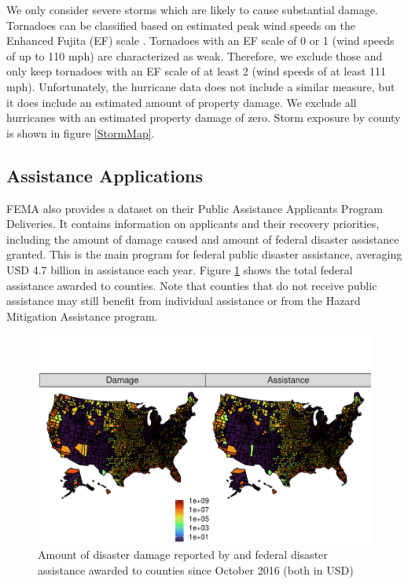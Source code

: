 We only consider severe storms which are likely to cause substantial damage. Tornadoes can be classified based on estimated peak wind speeds on the Enhanced Fujita (EF) scale \citep[for more details see][]{EF_Scale}. Tornadoes with an EF scale of 0 or 1 (wind speeds of up to 110 mph) are characterized as weak. Therefore, we exclude those and only keep tornadoes with an EF scale of at least 2 (wind speeds of at least 111 mph). Unfortunately, the hurricane data does not include a similar measure, but it does include an estimated amount of property damage. We exclude all hurricanes with an estimated property damage of zero.  Storm exposure by county is shown in figure \ref{StormMap}.

\subsection{Assistance Applications}

FEMA also provides a dataset on  their Public Assistance Applicants Program Deliveries. It contains information on applicants and their recovery priorities, including the amount of damage caused and amount of federal disaster assistance granted. This is the main program for federal public disaster assistance, averaging USD 4.7 billion in assistance each year. Figure \ref{AssistanceMap} shows the total federal assistance awarded to counties. Note that counties that do not receive public assistance may still benefit from individual assistance or from the Hazard Mitigation Assistance program.

\begin{figure}[!h]
	\centering
	\includegraphics[scale=1]{"../Code & Data/AssistanceMap.pdf"}
	\caption{Amount of disaster damage reported by and federal disaster assistance awarded to counties since October 2016 (both in USD)}
	\label{AssistanceMap}
\end{figure}

